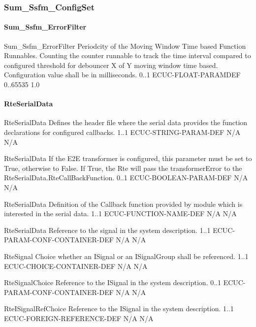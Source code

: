 \subsubsection{Sum_Ssfm_ConfigSet}

\paragraph{Sum_Ssfm_ErrorFilter}
{Sum_Ssfm_ErrorFilter}
{Periodcity of the Moving Window Time based Function Runnables. Counting the counter runnable to track the time interval compared to configured threshold for debouncer X of Y moving window time based. Configuration value shall be in milliseconds.}
{0..1}
{ECUC-FLOAT-PARAMDEF}
{0..65535}
{1.0}

\paragraph{RteSerialData}

{RteSerialData}
{Defines the header file where the serial data provides the function declarations for configured callbacks.}
{1..1}
{ECUC-STRING-PARAM-DEF}
{N/A}
{N/A}

{RteSerialData}
{If the E2E transformer is configured, this parameter must be set to True, otherwise to False. If True, the Rte will pass the transformerError to the RteSerialData.RteCallBackFunction.}
{0..1}
{ECUC-BOOLEAN-PARAM-DEF}
{N/A}
{N/A}

{RteSerialData}
{Definition of the Callback function provided by module which is interested in the serial data.}
{1..1}
{ECUC-FUNCTION-NAME-DEF}
{N/A}
{N/A}

{RteSerialData}
{Reference to the signal in the system description.}
{1..1}
{ECUC-PARAM-CONF-CONTAINER-DEF}
{N/A}
{N/A}

{RteSignal}
{Choice whether an ISignal or an ISignalGroup shall be referenced.}
{1..1}
{ECUC-CHOICE-CONTAINER-DEF}
{N/A}
{N/A}

{RteSignalChoice}
{Reference to the ISignal in the system description.}
{0..1}
{ECUC-PARAM-CONF-CONTAINER-DEF}
{N/A}
{N/A}


{RteISignalRefChoice}
{Reference to the ISignal in the system description.}
{1..1}
{ECUC-FOREIGN-REFERENCE-DEF}
{N/A}
{N/A}

